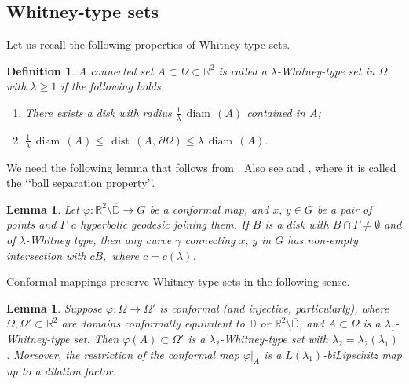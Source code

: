 \documentclass[reqno,11pt]{amsart}
\makeatletter
\def\dist{{\mathop\mathrm{\,dist\,}}}
\def\boz{{\Omega}}
\def\diam{{\mathop\mathrm{\,diam\,}}}
\newtheorem{lem}[thm]{Lemma}%
\newtheorem{defn}[thm]{Definition}%
\numberwithin{equation}{section}
\theoremstyle{remark}
\makeatother
\begin{document}
\subsection{Whitney-type sets} 
Let us recall the following properties of Whitney-type sets. 

\begin{defn}\label{whitney-type set}
 A connected set $A \subset \boz\subset \mathbb R^2$ is called a $\lambda$-Whitney-type set in $\Omega$ 
with  $\lambda\ge 1$ if the following holds. 
 \begin{enumerate}
\item There exists a disk with radius $\frac {1}{\lambda}\diam(A)$ contained in $A$;

\item $ \frac {1}{\lambda} \diam(A)\le \dist(A,\,\partial\Omega)\le {\lambda } \diam(A)$. 
 \end{enumerate}
\end{defn}

We need the following lemma that  follows
from \cite[Corollary 4.18]{P1992}. Also see \cite{BHK2001} and 
\cite[Theorem 0.1]{BB2003}, where it is called the \lq\lq{ball separation property}\rq\rq{}.  

\begin{lem}\label{ball separation}
Let $\varphi \colon \mathbb R^2\setminus \overline {\mathbb D}\to G$ be a conformal 
map, and $x,\,y\in G$ be a pair of points and $\Gamma$ a hyperbolic geodesic 
joining them. If $B$ is a disk with 
$B\cap\Gamma\neq \emptyset$ and of $\lambda$-Whitney type, then any curve 
$\gamma$ connecting $x,\,y$ in 
$G$ has non-empty intersection with $c B,$ where $c=c(\lambda)$.
\end{lem}

Conformal mappings preserve Whitney-type sets in the following sense. 

%


\begin{lem}\label{whitney preserving}
Suppose $\varphi\colon \Omega \to \Omega'$ is conformal  (and injective, particularly), 
where $\Omega,\Omega'\subset \mathbb R^2$  
are domains conformally equivalent to $\mathbb D$ or $ \mathbb R^2\setminus \overline{\mathbb D}$,
and $A\subset \Omega$ is a $\lambda_1$-Whitney-type set. Then 
$\varphi(A)\subset \Omega'$ is a $\lambda_2$-Whitney-type set with $ \lambda_2=\lambda_2(\lambda_1)$. Moreover, the restriction of the conformal map $\varphi|_{A}$ is a $L(\lambda_1)$-biLipschitz map up to a dilation factor. 
\end{lem}
\end{document}
